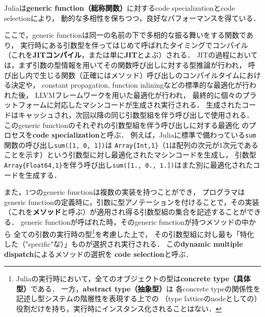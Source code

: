 Juliaは\textbf{generic function（総称関数）}に対するcode specializationとcode selectionにより，
動的な多相性を保ちつつ，良好なパフォーマンスを得ている\cite{jeff-phd}．

ここで，generic functionは同一の名前の下で多相的な振る舞いをする関数であり，
実行時にある引数型を伴ってはじめて呼ばれたタイミングでコンパイル
（これを\textbf{JITコンパイル}，または単に\textbf{JIT}とよぶ）される．
JITの過程においては，まず引数の型情報を用いてその関数呼び出しに対する型推論が行われ，
呼び出し内で生じる関数（正確にはメソッド）呼び出しのコンパイルタイムにおける決定や，
constant propagation, function inliningなどの標準的な最適化が行われた後，
LLVMフレームワーク\cite{LLVM}を用いた最適化が行われ，
最終的に個々のプラットフォームに対応したマシンコードが生成され実行される．
生成されたコードはキャッシュされ，次回以降の同じ引数型組を伴う呼び出しで使用される．
このgeneric functionのそれぞれの引数型組を伴う呼び出しに対する最適化
のプロセスを\textbf{code specialization}\footnotemark と呼ぶ．
例えば，Juliaに標準で備わっている\verb|sum|関数の呼び出し\verb|sum([1, 0, 1])|は
\verb|Array{Int,1}|（\verb|1|は配列の次元が1次元であることを示す）という引数型に対し最適化されたマシンコードを生成し，
引数型\verb|Array{Float64,1}|を伴う呼び出し\verb|sum([1., 0., 1.])|はまた別に最適化されたコードを生成する．


また，1つのgeneric functionは複数の実装を持つことができ，
プログラマはgeneric functionの定義時に，引数に型アノテーションを付けることで，その実装
（これを\textbf{メソッド}と呼ぶ）が適用され得る引数型組の集合を記述することができる．
generic functionが呼ばれた時，そのgeneric functionが持つメソッドの中から
全ての引数の実行時の型\footnote{
  Juliaの実行時において，全てのオブジェクトの型は\textbf{concrete type（具体型）}である．
  一方，\textbf{abstract type（抽象型）}は
  各concrete typeの関係性を記述し型システムの階層性を表現する上での
  （type latticeのnodeとしての）役割だけを持ち，実行時にインスタンス化されることはない．
}を考慮した上で，
その引数型組に対し最も「特化した（"specific"\footnotemark な）」ものが選択され実行される．
この\textbf{dynamic multiple dispatch}によるメソッドの選択を
\textbf{code selection}と呼ぶ．

